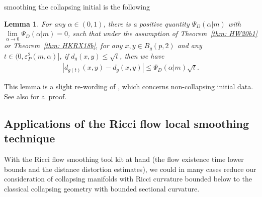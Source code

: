 \documentclass[10pt,a4paper]{amsart}
\numberwithin{equation}{section}
\newtheorem{Lemma}[Theorem]{Lemma}
\begin{document}
smoothing the collapsing initial is the following
\begin{Lemma}\label{lem: dis_dis1}
For any $\alpha\in (0,1)$, there is a positive quantity $\Psi_D(\alpha|m)$
with $\lim\limits_{\alpha\to 0}\Psi_D(\alpha|m)=0$, such that under the assumption of
Theorem~{\rm \ref{thm: HW20b1}} or Theorem~{\rm \ref{thm: HKRX18b}}, for any $x,y\in
B_g(p,2)$ and any $t\in \big(0,\varepsilon^2_P(m,\alpha)\big]$, if $d_g(x,y)\le
\sqrt{t}$, then we have
\begin{gather*}%
|d_{g(t)}(x,y)- d_g(x,y)| \le \Psi_D(\alpha|m)\sqrt{t}.
\end{gather*}
\end{Lemma}

This lemma is a slight re-wording of \cite[Lemma~1.11]{HKRX18}, which concerns
non-collapsing initial data. See also \cite[Lemma~4.1]{HW20b} for a~proof.

\subsection{Applications of the Ricci flow local smoothing technique}\label{section4.4}
With the Ricci flow smoothing tool kit at hand (the flow existence time lower
bounds and the distance distortion estimates), we could in many cases reduce our
consideration of collapsing manifolds with Ricci curvature bounded below to the
classical collapsing geometry with bounded sectional curvature.
\end{document}
